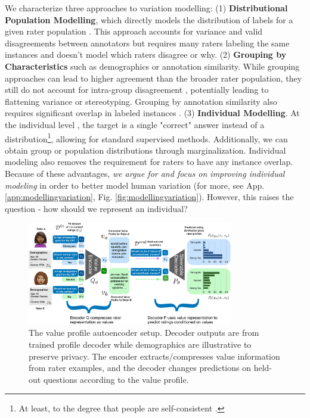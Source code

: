 \documentclass[11pt]{article}
\begin{document}
We characterize three approaches to variation modelling:
(1) {\textbf{Distributional Population Modelling}}, which directly models the distribution of labels for a given rater population \citep{zhang2024divergingpreferencesannotatorsdisagree, siththaranjan2024distributionalpreferencelearningunderstanding}. This approach accounts for variance and valid disagreements between annotators but requires many raters labeling the same instances and doesn't model which raters disagree or why. (2)  {\textbf{Grouping by Characteristics}} such as demographics or annotation similarity. While grouping approaches can lead to higher agreement than the broader rater population, they still do not account for intra-group disagreement \citep{hwang2023aligninglanguagemodelsuser, prabhakaran-etal-2024-grasp}, potentially leading to flattening variance or stereotyping.
Grouping by annotation similarity also requires significant overlap in labeled instances \citep{li-etal-2024-steerability, vitsakis2024voicescrowdsearchingclusters}.
(3) {\textbf{ Individual Modelling}}. At the individual level \citep{Gordon_2022, jiang2024languagemodelsreasonindividualistic}, the target is a single "correct" answer instead of a distribution\footnote{ At least, to the degree that people are self-consistent \citep{abercrombie2023consistencykeydisentanglinglabel}.}, allowing for standard supervised methods.
Additionally, we can obtain group or population distributions through marginalization. Individual modeling also removes the requirement for raters to have any instance overlap. 
Because of these advantages, \textit{we argue for and focus on improving individual modeling} in order to better model human variation
(for more, see App. \ref{app:modellingvariation}, Fig. \ref{fig:modellingvariation}).
However, this raises the question - how should we represent an individual?

\begin{figure}[t]
\centering
\includegraphics[width=0.8\textwidth]{files/vp_roma_new.pdf}
\small{
\caption{The value profile autoencoder setup. Decoder outputs are from trained profile decoder while demographics are illustrative to preserve privacy. The encoder extracts/compresses value information from rater examples, and the decoder changes predictions on held-out questions according to the value profile.
}
}
\label{fig:my_label}
\end{figure}
\end{document}
